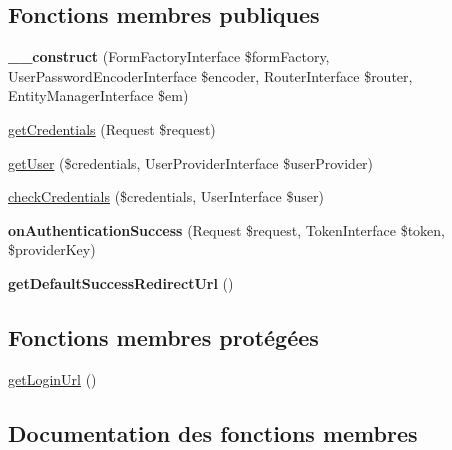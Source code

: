 \subsection*{Fonctions membres publiques}
\begin{DoxyCompactItemize}
\item 
\mbox{\label{classAppBundle_1_1Security_1_1UserAuthenticator_a5cb01cfb7331e4e083540521b131d74f}} 
{\bfseries \+\_\+\+\_\+construct} (Form\+Factory\+Interface \$form\+Factory, User\+Password\+Encoder\+Interface \$encoder, Router\+Interface \$router, Entity\+Manager\+Interface \$em)
\item 
\hyperlink{classAppBundle_1_1Security_1_1UserAuthenticator_af627fa4cca3a3a5cbe2ca81f1875b7ff}{get\+Credentials} (Request \$request)
\item 
\hyperlink{classAppBundle_1_1Security_1_1UserAuthenticator_a4f446bc07605bcfa92e2dfb6d20dc9b2}{get\+User} (\$credentials, User\+Provider\+Interface \$user\+Provider)
\item 
\hyperlink{classAppBundle_1_1Security_1_1UserAuthenticator_ab998f6a4f9065aa65184a9a3a72db31c}{check\+Credentials} (\$credentials, User\+Interface \$user)
\item 
\mbox{\label{classAppBundle_1_1Security_1_1UserAuthenticator_a2790107232881534993e88d7a1627f5e}} 
{\bfseries on\+Authentication\+Success} (Request \$request, Token\+Interface \$token, \$provider\+Key)
\item 
\mbox{\label{classAppBundle_1_1Security_1_1UserAuthenticator_a7f8c85e740637103f61d6cc7a24c5f31}} 
{\bfseries get\+Default\+Success\+Redirect\+Url} ()
\end{DoxyCompactItemize}
\subsection*{Fonctions membres protégées}
\begin{DoxyCompactItemize}
\item 
\hyperlink{classAppBundle_1_1Security_1_1UserAuthenticator_a8323994f489e8a2e5a7f58e1fc05b77f}{get\+Login\+Url} ()
\end{DoxyCompactItemize}


\subsection{Documentation des fonctions membres}
\mbox{\label{classAppBundle_1_1Security_1_1UserAuthenticator_ab998f6a4f9065aa65184a9a3a72db31c}} 
